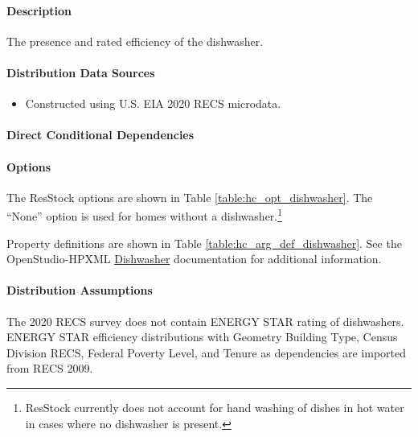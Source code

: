 \paragraph{Description}
% 
The presence and rated efficiency of the dishwasher.

\paragraph{Distribution Data Sources}
% 
\begin{itemize}
\item Constructed using U.S. EIA 2020 RECS microdata. 
\end{itemize}

\paragraph{Direct Conditional Dependencies}


\paragraph{Options}
The ResStock options are shown in Table \ref{table:hc_opt_dishwasher}. The ``None'' option is used for homes without a dishwasher.\footnote{ResStock currently does not account for hand washing of dishes in hot water in cases where no dishwasher is present.}



Property definitions are shown in Table \ref{table:hc_arg_def_dishwasher}. See the OpenStudio-HPXML \href{https://openstudio-hpxml.readthedocs.io/en/v1.10.0/workflow_inputs.html#hpxml-dishwasher}{Dishwasher} documentation for additional information.



\paragraph{Distribution Assumptions}
% 
The 2020 RECS survey does not contain ENERGY STAR rating of dishwashers. ENERGY STAR efficiency distributions with Geometry Building Type, Census Division RECS, Federal Poverty Level, and Tenure as dependencies are imported from RECS 2009.

